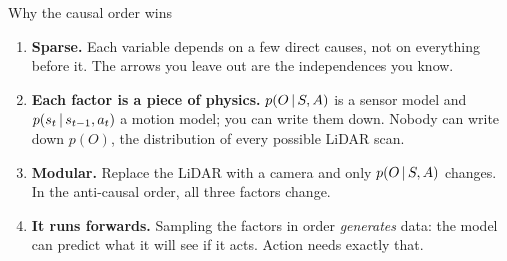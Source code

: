 \documentclass[10pt, aspectratio=169]{beamer}
\begin{document}
\begin{frame}{Why the causal order wins}
  \begin{enumerate}
    \item \textbf{Sparse.} Each variable depends on a few direct causes, not on everything
          before it. The arrows you leave out are the independences you know.
    \item \textbf{Each factor is a piece of physics.} $p(O\,|\, S, A)$ is a sensor model and
          $p(s_t\,|\, s_{t-1}, a_t)$ a motion model; you can write them down. Nobody can write
          down $p(O)$, the distribution of every possible LiDAR scan.
    \item \textbf{Modular.} Replace the LiDAR with a camera and only $p(O\,|\, S, A)$ changes.
          In the anti-causal order, all three factors change.
    \item \textbf{It runs forwards.} Sampling the factors in order \emph{generates} data: the
          model can predict what it will see if it acts. Action needs exactly that.
  \end{enumerate}
\end{frame}
\end{document}

